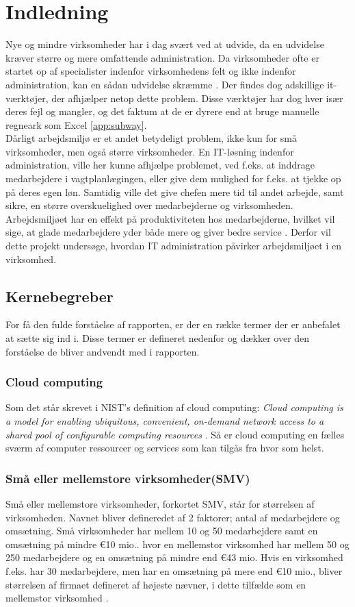 \chapter{Indledning}
Nye og mindre virksomheder har i dag svært ved at udvide, da en udvidelse kræver større og mere omfattende administration. Da virksomheder ofte er startet op af specialister indenfor virksomhedens felt og ikke indenfor administration, kan en sådan udvidelse skræmme \citep{SmaaFirmaerOrker}. Der findes dog adskillige it-værktøjer, der afhjælper netop dette problem. Disse værktøjer har dog hver især deres fejl og mangler, og det faktum at de er dyrere end at bruge manuelle regneark som Excel \citep{Play}\ref{app:subway}.\\
Dårligt arbejdsmiljø er et andet betydeligt problem, ikke kun for små virksomheder, men også større virksomheder. En IT-løsning indenfor administration, ville her kunne afhjælpe problemet, ved f.eks. at inddrage medarbejdere i vagtplanlægingen, eller give dem mulighed for f.eks. at tjekke op på deres egen løn. Samtidig ville det give chefen mere tid til andet arbejde, samt sikre, en større overskuelighed over medarbejderne og virksomheden. 
Arbejdsmiljøet har en effekt på produktiviteten hos medarbejderne, hvilket vil sige, at glade medarbejdere yder både mere og giver bedre service \citep{Jensen2014}. Derfor vil dette projekt undersøge, hvordan IT administration påvirker arbejdsmiljøet i en virksomhed.

\section{Kernebegreber}
For få den fulde forståelse af rapporten, er der en række termer der er anbefalet at sætte sig ind i. Disse termer er defineret nedenfor og dækker over den forståelse de bliver andvendt med i rapporten. 
\subsection{Cloud computing}
Som det står skrevet i NIST’s definition af cloud computing: \textit{Cloud computing is a model for enabling ubiquitous, convenient, on-demand network access to a shared pool of configurable computing resources} \citep{cloud_def}. Så er cloud computing en fælles sværm af computer ressourcer og services som kan tilgås fra hvor som helst.

\subsection{Små eller mellemstore virksomheder(SMV)}
Små eller mellemstore virksomheder, forkortet SMV, står for størrelsen af virksomheden. Navnet bliver defineredet af 2 faktorer; antal af medarbejdere og omsætning. Små virksomheder har mellem 10 og 50 medarbejdere samt en omsætning på mindre \euro 10 mio.. hvor en mellemstor virksomhed har mellem 50 og 250 medarbejdere og en omsætning på mindre end \euro 43 mio. Hvis en virksomhed f.eks. har 30 medarbejdere, men har en omsætning på mere end \euro 10 mio., bliver størrelsen af firmaet defineret af højeste nævner, i dette tilfælde som en mellemstor virksomhed \citep{SMV}.


